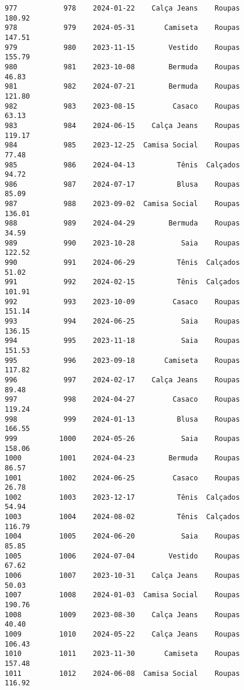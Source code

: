 \documentclass[11pt]{article}
\begin{document}
\begin{Verbatim}[commandchars=\\\{\}]
977           978    2024-01-22    Calça Jeans    Roupas          180.92   
978           979    2024-05-31       Camiseta    Roupas          147.51   
979           980    2023-11-15        Vestido    Roupas          155.79   
980           981    2023-10-08        Bermuda    Roupas           46.83   
981           982    2024-07-21        Bermuda    Roupas          121.80   
982           983    2023-08-15         Casaco    Roupas           63.13   
983           984    2024-06-15    Calça Jeans    Roupas          119.17   
984           985    2023-12-25  Camisa Social    Roupas           77.48   
985           986    2024-04-13          Tênis  Calçados           94.72   
986           987    2024-07-17          Blusa    Roupas           85.09   
987           988    2023-09-02  Camisa Social    Roupas          136.01   
988           989    2024-04-29        Bermuda    Roupas           34.59   
989           990    2023-10-28           Saia    Roupas          122.52   
990           991    2024-06-29          Tênis  Calçados           51.02   
991           992    2024-02-15          Tênis  Calçados          101.91   
992           993    2023-10-09         Casaco    Roupas          151.14   
993           994    2024-06-25           Saia    Roupas          136.15   
994           995    2023-11-18           Saia    Roupas          151.53   
995           996    2023-09-18       Camiseta    Roupas          117.82   
996           997    2024-02-17    Calça Jeans    Roupas           89.48   
997           998    2024-04-27         Casaco    Roupas          119.24   
998           999    2024-01-13          Blusa    Roupas          166.55   
999          1000    2024-05-26           Saia    Roupas          158.06   
1000         1001    2024-04-23        Bermuda    Roupas           86.57   
1001         1002    2024-06-25         Casaco    Roupas           26.78   
1002         1003    2023-12-17          Tênis  Calçados           54.94   
1003         1004    2024-08-02          Tênis  Calçados          116.79   
1004         1005    2024-06-20           Saia    Roupas           85.85   
1005         1006    2024-07-04        Vestido    Roupas           67.62   
1006         1007    2023-10-31    Calça Jeans    Roupas           50.03   
1007         1008    2024-01-03  Camisa Social    Roupas          190.76   
1008         1009    2023-08-30    Calça Jeans    Roupas           40.40   
1009         1010    2024-05-22    Calça Jeans    Roupas          106.43   
1010         1011    2023-11-30       Camiseta    Roupas          157.48   
1011         1012    2024-06-08  Camisa Social    Roupas          116.92   

\end{Verbatim}
\end{document}
